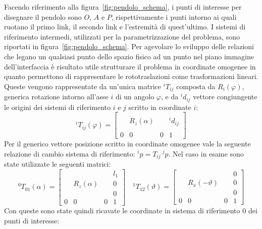  Facendo riferimento alla figura~\ref{fig:pendolo_schema}, i punti di interesse per disegnare il pendolo sono $O$, $A$ e $P$, rispettivamente i punti intorno ai quali ruotano il primo link, il secondo link e l'estremit\`a di quest'ultimo. I sistemi di riferimento intermedi, utilizzati per la parametrizzazione del problema, sono riportati in figura~\ref{fig:pendolo_schema}. Per agevolare lo sviluppo delle relazioni che legano un qualsiasi punto dello spazio fisico ad un punto nel piano immagine dell'interfaccia \`e risultato utile strutturare il problema in coordinate omogenee in quanto permettono di rappresentare le rototraslazioni come trasformazioni lineari. Queste vengono rappresentate da un'unica matrice $^i T_{ij}$ composta da $R_i(\varphi)$,  generica rotazione intorno all'asse $i$ di un angolo $\varphi$, e da $^i d_{ij}$ vettore congiungente le origini dei sistemi di riferimento $i$ e $j$ scritto in coordinate $i$:
 \begin{equation}
	 ^i\! T_{ij}(\varphi) = \left[ \begin{array}{ccc|c}
	 & & & \\
	 & R_z(\alpha) & & ^i d_{ij} \\
	 & & & \\
	 \hline
	 0 & 0 & 0 & 1
	 \end{array} \right]
 \end{equation}
Per il generico vettore posizione scritto in coordinate omogenee vale la seguente relazione di cambio sistema di riferimento: $^ip = T_{ij}\ ^j p$. Nel caso in esame sono state utilizzate le seguenti matrici:
\begin{equation}
	^0\! T_{01}(\alpha) = \left[ \begin{array}{ccc|c}
	& & & l_1 \\
	& R_z(\alpha) & & 0 \\
	& & & 0 \\
	\hline
	0 & 0 & 0 & 1
	\end{array} \right]
	\quad 
	^1 T_{12}(\vartheta) =
	\left[  \begin{array}{ccc|c}
	& & & 0 \\
	& R_x(- \vartheta) & & 0 \\
	& & & 0 \\
	\hline
	0 & 0 & 0 & 1
	\end{array}
	\right]
\label{eq:cambio_coordinate}
\end{equation}
Con queste sono state quindi ricavate le coordinate in sistema di riferimento $0$ dei punti di interesse:
